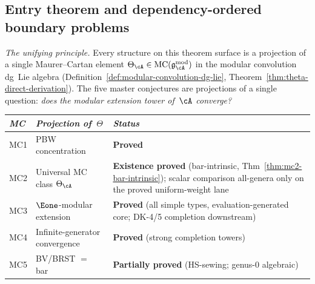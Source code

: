 \subsection{Entry theorem and dependency-ordered boundary problems}
\label{subsec:five-master-conjectures}

\emph{The unifying principle.}
Every structure on this theorem surface is a projection of a single
Maurer--Cartan element
$\Theta_\cA \in
\operatorname{MC}(\mathfrak{g}_\cA^{\mathrm{mod}})$
in the modular convolution dg~Lie algebra
(Definition~\ref{def:modular-convolution-dg-lie},
Theorem~\ref{thm:theta-direct-derivation}).
The five master conjectures are projections of a single question:
\emph{does the modular extension tower of\/~$\cA$ converge?}
\begin{center}
\small
\renewcommand{\arraystretch}{1.2}
\begin{tabular}{lll}
\toprule
\emph{MC} & \emph{Projection of~$\Theta$} & \emph{Status} \\
\midrule
MC1 & PBW concentration
 & \textbf{Proved} \\
MC2 & Universal MC class $\Theta_\cA$
 & \textbf{Existence proved} (bar-intrinsic, Thm~\ref{thm:mc2-bar-intrinsic}); scalar comparison all-genera only on the proved uniform-weight lane \\
MC3 & $\Eone$-modular extension
 & \textbf{Proved} (all simple types, evaluation-generated core; DK-4/5 completion downstream) \\
MC4 & Infinite-generator convergence
 & \textbf{Proved} (strong completion towers) \\
MC5 & BV/BRST $=$ bar
 & \textbf{Partially proved} (HS-sewing; genus-$0$ algebraic) \\
\bottomrule
\end{tabular}
\end{center}


